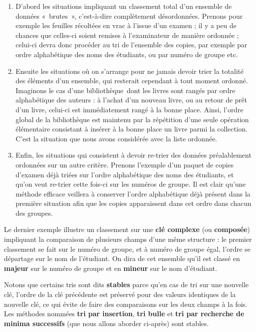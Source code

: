 		\liststyleWWviiiNumi
		\begin{enumerate}
			\item 
				D’abord les situations impliquant un classement total d’un ensemble de
				données «~brutes~», c’est-à-dire complètement désordonnées. Prenons
				pour exemple les feuilles récoltées en vrac à l’issue d’un examen ; il
				y a peu de chances que celles-ci soient remises à l’examinateur de
				manière ordonnée ; celui-ci devra donc procéder au tri de l’ensemble
				des copies, par exemple par ordre alphabétique des noms des étudiants,
				ou par numéro de groupe etc.
			\item 
				Ensuite les situations où on s’arrange pour ne jamais devoir trier la
				totalité des éléments d’un ensemble, qui resterait cependant à tout
				moment ordonné. Imaginons le cas d’une bibliothèque~dont les livres
				sont rangés par ordre alphabétique des auteurs : à l’achat d’un nouveau
				livre, ou au retour de prêt d’un livre, celui-ci est immédiatement
				rangé à la bonne place. Ainsi, l’ordre global de la bibliothèque est
				maintenu par la répétition d’une seule opération élémentaire consistant
				à insérer à la bonne place un livre parmi la collection. C’est la
				situation que nous avons considérée avec la liste ordonnée.
			\item 
				Enfin, les situations qui consistent à devoir re-trier des données
				préalablement ordonnées sur un autre critère. Prenons l’exemple d’un
				paquet de copies d’examen déjà triées sur l’ordre alphabétique des noms
				des étudiants, et qu’on veut re-trier cette fois-ci sur les numéros de
				groupe. Il est clair qu’une méthode efficace veillera à conserver
				l’ordre alphabétique déjà présent dans la première situation afin que
				les copies apparaissent dans cet ordre dans chacun des groupes.
		\end{enumerate}
		
		Le dernier exemple illustre un classement sur une \textbf{clé complexe}
		(ou \textbf{composée}) impliquant la comparaison de plusieurs champs
		d’une même structure : le premier classement se fait sur le numéro de
		groupe, et à numéro de groupe égal, l’ordre se départage sur le nom de
		l’étudiant. On dira de cet ensemble qu’il est classé en \textbf{majeur}
		sur le numéro de groupe et en \textbf{mineur} sur le nom d’étudiant.

		Notons que certains tris sont dits \textbf{stables} parce
		qu'en cas de tri sur une nouvelle clé, l’ordre de la
		clé précédente est préservé pour des valeurs identiques de la nouvelle
		clé, ce qui évite de faire des comparaisons sur les deux champs à la
		fois. Les méthodes nommées \textbf{tri par insertion}, \textbf{tri
		bulle} et \textbf{tri par recherche de minima successifs }(que nous
		allons aborder ci-après) sont stables.

